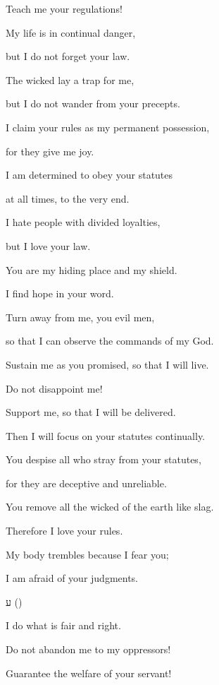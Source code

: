 {\par }{\Q Teach
me your regulations!
\par }{\Q {}My life
is in continual
danger,
\par }{\Q but I do not
forget
your law.
\par }{\Q {}The wicked
lay a trap
for me,
\par }{\Q but I do not
wander
from your precepts.
\par }{\Q {}I claim
your rules
as my permanent
possession,
\par }{\Q for
they
give me joy.
\par }{\Q {}I am determined
to obey
your statutes
\par }{\Q at all times,
to the very end.
\par }{\SH 
{}{}{\BD{)}}
\par }{\Q {}I hate people with divided loyalties,
\par }{\Q but I love your law.
\par }{\Q {}You are my hiding
place and my shield.
\par }{\Q I find hope
in your word.
\par }{\Q {}Turn
away from me,
you evil
men,
\par }{\Q so that I can observe
the commands
of my God.
\par }{\Q {}Sustain
me as you promised,
so that I will live.
\par }{\Q Do not
disappoint me!
\par }{\Q {}Support
me, so that I will be delivered.
\par }{\Q Then I will focus
on your statutes
continually.
\par }{\Q {}You despise
all
who stray
from your statutes,
\par }{\Q for
they are deceptive
and unreliable.
\par }{\Q {}You remove
all
the wicked
of the earth
like slag.
\par }{\Q Therefore
I love
your rules.
\par }{\Q {}My body
trembles
because I fear
you;

\par }{\Q I am afraid
of your judgments.
\par }{\SH ע ({})
\par }{\Q {}I do what is fair and right.
\par }{\Q Do not abandon me to my oppressors!
\par }{\Q {}Guarantee
the welfare
of your servant!

}
